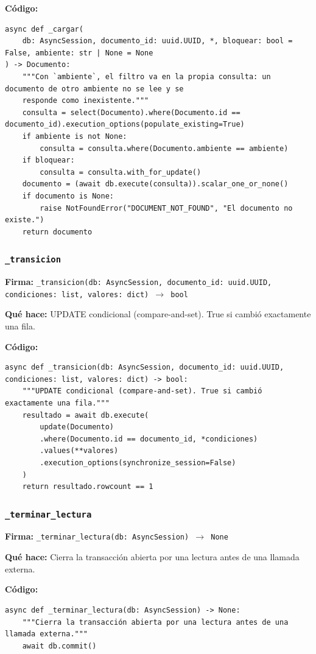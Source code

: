 \documentclass[11pt,a4paper]{article}
\begin{document}
\textbf{Código:}
\begin{lstlisting}
async def _cargar(
    db: AsyncSession, documento_id: uuid.UUID, *, bloquear: bool = False, ambiente: str | None = None
) -> Documento:
    """Con `ambiente`, el filtro va en la propia consulta: un documento de otro ambiente no se lee y se
    responde como inexistente."""
    consulta = select(Documento).where(Documento.id == documento_id).execution_options(populate_existing=True)
    if ambiente is not None:
        consulta = consulta.where(Documento.ambiente == ambiente)
    if bloquear:
        consulta = consulta.with_for_update()
    documento = (await db.execute(consulta)).scalar_one_or_none()
    if documento is None:
        raise NotFoundError("DOCUMENT_NOT_FOUND", "El documento no existe.")
    return documento
\end{lstlisting}

\subsubsection*{\texttt{\_transicion}}
\textbf{Firma:} \texttt{\_transicion(db: AsyncSession, documento\_id: uuid.UUID, condiciones: list, valores: dict) $\rightarrow$ bool}

\textbf{Qué hace:} UPDATE condicional (compare-and-set). True si cambió exactamente una fila.

\textbf{Código:}
\begin{lstlisting}
async def _transicion(db: AsyncSession, documento_id: uuid.UUID, condiciones: list, valores: dict) -> bool:
    """UPDATE condicional (compare-and-set). True si cambió exactamente una fila."""
    resultado = await db.execute(
        update(Documento)
        .where(Documento.id == documento_id, *condiciones)
        .values(**valores)
        .execution_options(synchronize_session=False)
    )
    return resultado.rowcount == 1
\end{lstlisting}

\subsubsection*{\texttt{\_terminar\_lectura}}
\textbf{Firma:} \texttt{\_terminar\_lectura(db: AsyncSession) $\rightarrow$ None}

\textbf{Qué hace:} Cierra la transacción abierta por una lectura antes de una llamada externa.

\textbf{Código:}
\begin{lstlisting}
async def _terminar_lectura(db: AsyncSession) -> None:
    """Cierra la transacción abierta por una lectura antes de una llamada externa."""
    await db.commit()
\end{lstlisting}
\end{document}
